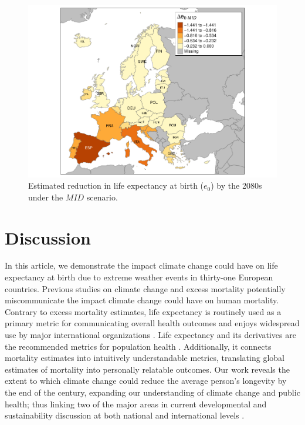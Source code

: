 \documentclass[12pt]{article}
\begin{document}
\begin{figure}
\centering
\includegraphics{MANUSCRIPT_files/figure-latex/figure-map-1.pdf}
\caption{Estimated reduction in life expectancy at birth (\(e_0\)) by
the 2080s under the \(MID\) scenario.\label{map}}
\end{figure}

\section{Discussion}\label{discussion}

In this article, we demonstrate the impact climate change could have on
life expectancy at birth due to extreme weather events in thirty-one
European countries. Previous studies on climate change and excess
mortality potentially miscommunicate the impact climate change could
have on human mortality. Contrary to excess mortality estimates, life
expectancy is routinely used as a primary metric for communicating
overall health outcomes and enjoys widespread use by major international
organizations
\citep{world2015world, marmot2012building, salomon2012healthy}. Life
expectancy and its derivatives are the recommended metrics for
population health \citep{parrish2010peer}. Additionally, it connects
mortality estimates into intuitively understandable metrics, translating
global estimates of mortality into personally relatable outcomes. Our
work reveals the extent to which climate change could reduce the average
person's longevity by the end of the century, expanding our
understanding of climate change and public health; thus linking two of
the major areas in current developmental and sustainability discussion
at both national and international levels \citep{abel2016meeting}.
\end{document}
